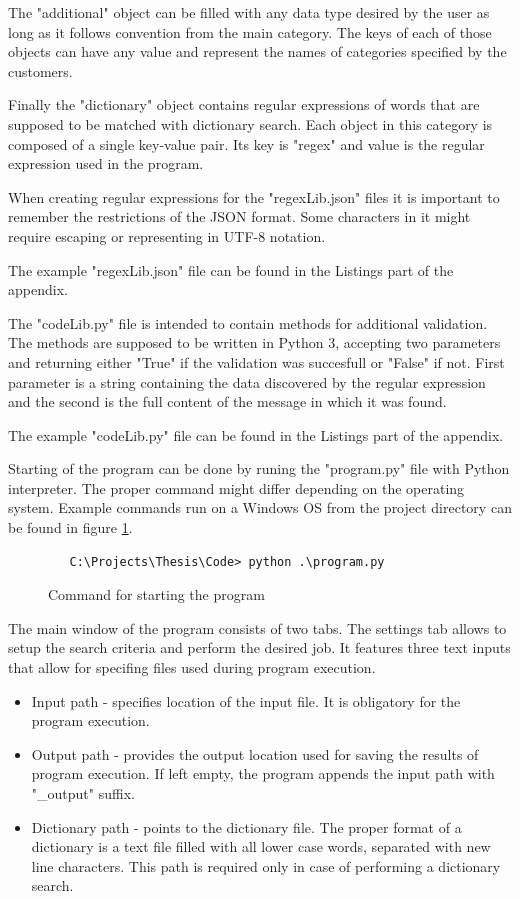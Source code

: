 \documentclass[a4paper,twoside,12pt]{book}
\begin{document}
The "additional" object can be filled with any data type desired by the user as long 
as it follows convention from the main category. The keys of each of those objects can have any value and represent the names of categories
specified by the customers.

Finally the "dictionary" object contains regular expressions of words that are supposed to be matched with dictionary search. Each object in this category 
is composed of a single key-value pair. Its key is "regex" and value is the regular expression used in the program. 

When creating regular expressions for the "regexLib.json" files it is important to remember the restrictions of the 
JSON format. Some characters in it might require escaping or representing in UTF-8 notation.

The example "regexLib.json" file can be found in the Listings part of the appendix.

The "codeLib.py" file is intended to contain methods for additional validation. The methods are supposed
to be written in Python 3, accepting two parameters and returning either "True" if the validation was succesfull
or "False" if not. First parameter is a string containing the data discovered by the regular expression and
the second is the full content of the message in which it was found.

The example "codeLib.py" file can be found in the Listings part of the appendix.

Starting of the program can be done by runing the "program.py" file with Python interpreter. The proper command
might differ depending on the operating system. Example commands run on a Windows OS from the project directory
can be found in figure \ref{fig:startCommand}.

\begin{figure}
   \centering
   \begin{lstlisting}
   C:\Projects\Thesis\Code> python .\program.py
   \end{lstlisting}
   \caption{Command for starting the program}
   \label{fig:startCommand}
\end{figure}

The main window of the program consists of two tabs. The settings tab allows to setup the search criteria and perform
the desired job. It features three text inputs that allow for specifing files used during program execution.

\begin{itemize}
   \item Input path - specifies location of the input file. It is obligatory for the program execution.
   \item Output path - provides the output location used for saving the results of program execution. 
   If left empty, the program appends the input path with "\_output" suffix. 
   \item Dictionary path - points to the dictionary file. The proper format of a dictionary
   is a text file filled with all lower case words, separated with new line characters. This path is required
   only in case of performing a dictionary search.
\end{itemize}
\end{document}
